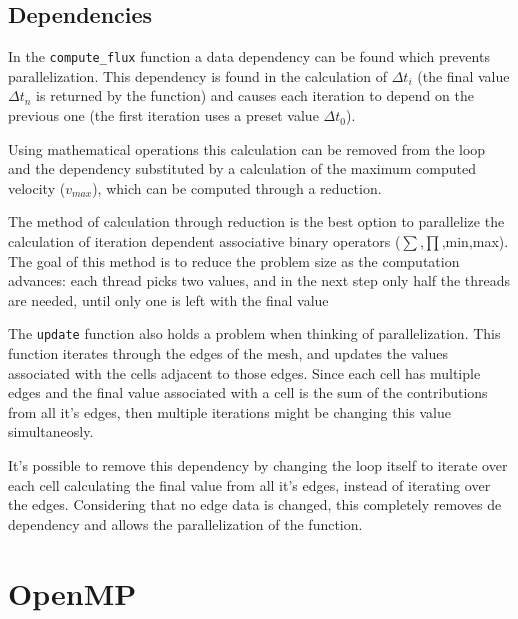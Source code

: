 \documentclass[9pt,twocolumn]{scrartcl}
\begin{document}
\subsection{Dependencies}
In the \texttt{compute\_flux} function a data dependency can be found which prevents parallelization. This dependency is found in the calculation of $\Delta t_{i}$ (the final value $\Delta t_{n}$ is returned by the function) and causes each iteration to depend on the previous one (the first iteration uses a preset value $\Delta t_{0}$).

Using mathematical operations this calculation can be removed from the loop and the dependency substituted by a calculation of the maximum computed velocity ($v_{max}$), which can be computed through a reduction.

The method of calculation through reduction is the best option to parallelize the calculation of iteration dependent associative binary operators ($\sum$,$\prod$,min,max). The goal of this method is to reduce the problem size as the computation advances: each thread picks two values, and in the next step only half the threads are needed, until only one is left with the final value


The \texttt{update} function also holds a problem when thinking of parallelization. This function iterates through the edges of the mesh, and updates the values associated with the cells adjacent to those edges. Since each cell has multiple edges and the final value associated with a cell is the sum of the contributions from all it's edges, then multiple iterations might be changing this value simultaneosly.

It's possible to remove this dependency by changing the loop itself to iterate over each cell calculating the final value from all it's edges, instead of iterating over the edges. Considering that no edge data is changed, this completely removes de dependency and allows the parallelization of the function.

\section{OpenMP}
\label{sec:openmp}
\end{document}

